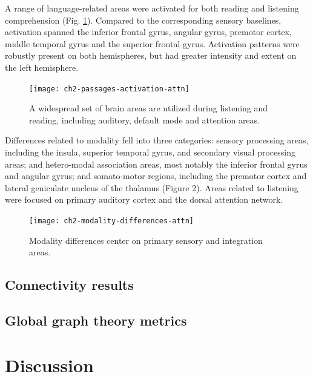 A range of language-related areas were activated for both reading and listening comprehension (Fig. \ref{fig:ch2-passages-activation-attn}). Compared to the corresponding sensory baselines, activation spanned the inferior frontal gyrus, angular gyrus, premotor cortex, middle temporal gyrus and the superior frontal gyrus. Activation patterns were robustly present on both hemispheres, but had greater intensity and extent on the left hemisphere. 

\begin{figure}[tp]
	\centering
	\texttt{[image: ch2-passages-activation-attn]}
    \caption[There is significant overlap between the areas used in listening and reading.]{A widespread set of brain areas are utilized during listening and reading, including auditory, default mode and attention areas.}
	\label{fig:ch2-passages-activation-attn}
\end{figure}

Differences related to modality fell into three categories: sensory processing areas, including the insula, superior temporal gyrus, and secondary visual processing areas; and hetero-modal association areas, most notably the inferior frontal gyrus and angular gyrus; and somato-motor regions, including the premotor cortex and lateral geniculate nucleus of the thalamus (Figure 2). Areas related to listening were focused on primary auditory cortex and the dorsal attention network. 

\begin{figure}[!b]
	\centering
	\texttt{[image: ch2-modality-differences-attn]}
    \caption[Modality differences center on primary sensory and integration areas.]{Modality differences center on primary sensory and integration areas.}
	\label{fig:ch2-modality-differences-attn}
\end{figure}

\subsection{Connectivity results}


\subsection{Global graph theory metrics}


\section{Discussion}



